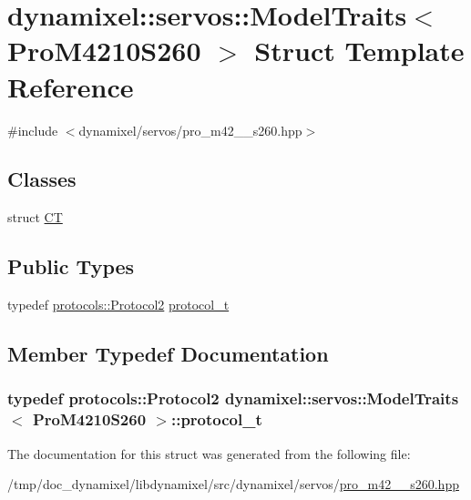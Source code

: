 \hypertarget{structdynamixel_1_1servos_1_1_model_traits_3_01_pro_m4210_s260_01_4}{}\section{dynamixel\+:\+:servos\+:\+:Model\+Traits$<$ Pro\+M4210\+S260 $>$ Struct Template Reference}
\label{structdynamixel_1_1servos_1_1_model_traits_3_01_pro_m4210_s260_01_4}


{\ttfamily \#include $<$dynamixel/servos/pro\+\_\+m42\+\_\+\_\+s260.\+hpp$>$}

\subsection*{Classes}
\begin{DoxyCompactItemize}
\item 
struct \hyperlink{structdynamixel_1_1servos_1_1_model_traits_3_01_pro_m4210_s260_01_4_1_1_c_t}{CT}
\end{DoxyCompactItemize}
\subsection*{Public Types}
\begin{DoxyCompactItemize}
\item 
typedef \hyperlink{classdynamixel_1_1protocols_1_1_protocol2}{protocols\+::\+Protocol2} \hyperlink{structdynamixel_1_1servos_1_1_model_traits_3_01_pro_m4210_s260_01_4_afb54d94276457bc64d630689dc1fb5fc}{protocol\+\_\+t}
\end{DoxyCompactItemize}


\subsection{Member Typedef Documentation}
\subsubsection[{\texorpdfstring{protocol\+\_\+t}{protocol_t}}]{\setlength{\rightskip}{0pt plus 5cm}typedef {\bf protocols\+::\+Protocol2} {\bf dynamixel\+::servos\+::\+Model\+Traits}$<$ {\bf Pro\+M4210\+S260} $>$\+::{\bf protocol\+\_\+t}}\hypertarget{structdynamixel_1_1servos_1_1_model_traits_3_01_pro_m4210_s260_01_4_afb54d94276457bc64d630689dc1fb5fc}{}\label{structdynamixel_1_1servos_1_1_model_traits_3_01_pro_m4210_s260_01_4_afb54d94276457bc64d630689dc1fb5fc}


The documentation for this struct was generated from the following file\+:\begin{DoxyCompactItemize}
\item 
/tmp/doc\+\_\+dynamixel/libdynamixel/src/dynamixel/servos/\hyperlink{pro__m42__10__s260_8hpp}{pro\+\_\+m42\+\_\+\_\+s260.\+hpp}\end{DoxyCompactItemize}

